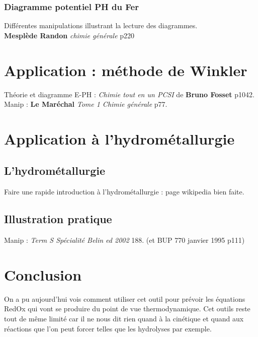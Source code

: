 \documentclass[12pt,prb,aps,epsf]{article}
\begin{document}
\subsubsection{Diagramme potentiel PH du Fer}
Différentes manipulations illustrant la lecture des diagrammes.\\
\textbf{Mesplède Randon} \textit{chimie générale} p220

\section{Application : méthode de Winkler}
Théorie et diagramme E-PH :
\textit{Chimie tout en un PCSI} de \textbf{Bruno Fosset} p1042.\\
Manip :
\textbf{Le Maréchal} \textit{Tome 1 Chimie générale} p77.

\section{Application à l'hydrométallurgie}

\subsection{L'hydrométallurgie}
Faire une rapide introduction à l'hydrométallurgie : page wikipedia bien faite.

\subsection{Illustration pratique}
Manip :
\textit{Term S Spécialité Belin ed 2002} 188. (et BUP 770 janvier 1995 p111)

\section{Conclusion}
On a pu aujourd'hui vois comment utiliser cet outil pour prévoir les équations RedOx qui vont se produire du point de vue thermodynamique. Cet outils reste tout de même limité car il ne nous dit rien quand à la cinétique et quand aux réactions que l'on peut forcer telles que les hydrolyses par exemple.

	
\end{document}
